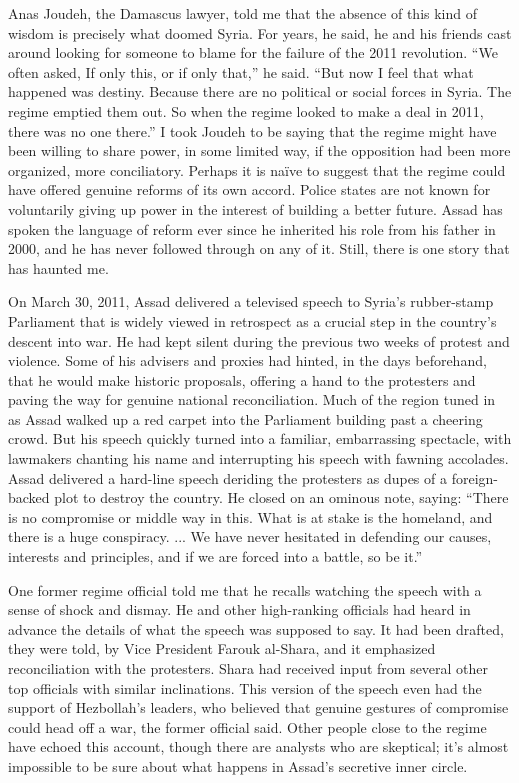 Anas Joudeh, the Damascus lawyer, told me that the absence of this kind
of wisdom is precisely what doomed Syria. For years, he said, he and his
friends cast around looking for someone to blame for the failure of the
2011 revolution. ``We often asked, If only this, or if only that,'' he
said. ``But now I feel that what happened was destiny. Because there are
no political or social forces in Syria. The regime emptied them out. So
when the regime looked to make a deal in 2011, there was no one there.''
I took Joudeh to be saying that the regime might have been willing to
share power, in some limited way, if the opposition had been more
organized, more conciliatory. Perhaps it is naïve to suggest that the
regime could have offered genuine reforms of its own accord. Police
states are not known for voluntarily giving up power in the interest of
building a better future. Assad has spoken the language of reform ever
since he inherited his role from his father in 2000, and he has never
followed through on any of it. Still, there is one story that has
haunted me.

On March 30, 2011, Assad delivered a televised speech to Syria's
rubber-stamp Parliament that is widely viewed in retrospect as a crucial
step in the country's descent into war. He had kept silent during the
previous two weeks of protest and violence. Some of his advisers and
proxies had hinted, in the days beforehand, that he would make historic
proposals, offering a hand to the protesters and paving the way for
genuine national reconciliation. Much of the region tuned in as Assad
walked up a red carpet into the Parliament building past a cheering
crowd. But his speech quickly turned into a familiar, embarrassing
spectacle, with lawmakers chanting his name and interrupting his speech
with fawning accolades. Assad delivered a hard-line speech deriding the
protesters as dupes of a foreign-backed plot to destroy the country. He
closed on an ominous note, saying: ``There is no compromise or middle
way in this. What is at stake is the homeland, and there is a huge
conspiracy. ... We have never hesitated in defending our causes,
interests and principles, and if we are forced into a battle, so be
it.''

One former regime official told me that he recalls watching the speech
with a sense of shock and dismay. He and other high-ranking officials
had heard in advance the details of what the speech was supposed to say.
It had been drafted, they were told, by Vice President Farouk al-Shara,
and it emphasized reconciliation with the protesters. Shara had received
input from several other top officials with similar inclinations. This
version of the speech even had the support of Hezbollah's leaders, who
believed that genuine gestures of compromise could head off a war, the
former official said. Other people close to the regime have echoed this
account, though there are analysts who are skeptical; it's almost
impossible to be sure about what happens in Assad's secretive inner
circle.


